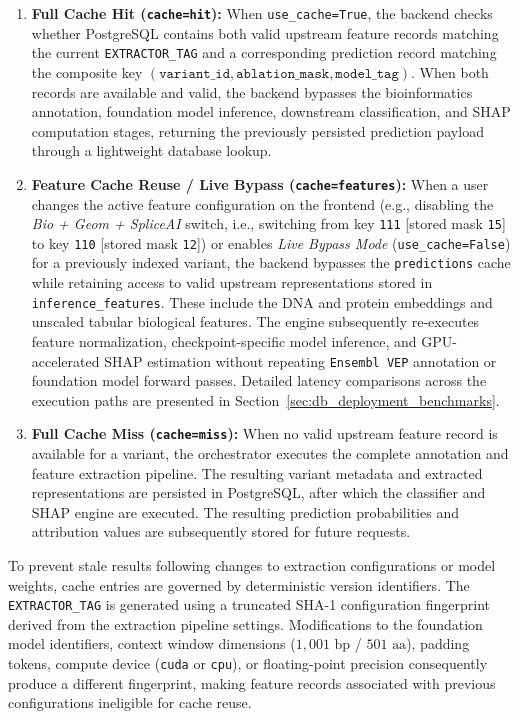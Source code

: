 \begin{enumerate}
    \item \textbf{Full Cache Hit (\texttt{cache=hit}):} When \texttt{use\_cache=True}, the backend checks whether PostgreSQL contains both valid upstream feature records matching the current \texttt{EXTRACTOR\_TAG} and a corresponding prediction record matching the composite key $(\texttt{variant\_id}, \texttt{ablation\_mask}, \texttt{model\_tag})$. When both records are available and valid, the backend bypasses the bioinformatics annotation, foundation model inference, downstream classification, and SHAP computation stages, returning the previously persisted prediction payload through a lightweight database lookup.

    \item \textbf{Feature Cache Reuse / Live Bypass (\texttt{cache=features}):} When a user changes the active feature configuration on the frontend (e.g., disabling the \textit{Bio + Geom + SpliceAI} switch, i.e., switching from key \texttt{111} [stored mask \texttt{15}] to key \texttt{110} [stored mask \texttt{12}]) or enables \textit{Live Bypass Mode} (\texttt{use\_cache=False}) for a previously indexed variant, the backend bypasses the \texttt{predictions} cache while retaining access to valid upstream representations stored in \texttt{inference\_features}. These include the DNA and protein embeddings and unscaled tabular biological features. The engine subsequently re-executes feature normalization, checkpoint-specific model inference, and GPU-accelerated SHAP estimation without repeating \texttt{Ensembl VEP} annotation or foundation model forward passes. Detailed latency comparisons across the execution paths are presented in Section~\ref{sec:db_deployment_benchmarks}.

    \item \textbf{Full Cache Miss (\texttt{cache=miss}):} When no valid upstream feature record is available for a variant, the orchestrator executes the complete annotation and feature extraction pipeline. The resulting variant metadata and extracted representations are persisted in PostgreSQL, after which the classifier and SHAP engine are executed. The resulting prediction probabilities and attribution values are subsequently stored for future requests.
\end{enumerate}

To prevent stale results following changes to extraction configurations or model weights, cache entries are governed by deterministic version identifiers. The \texttt{EXTRACTOR\_TAG} is generated using a truncated SHA-1 configuration fingerprint derived from the extraction pipeline settings. Modifications to the foundation model identifiers, context window dimensions ($1{,}001\text{ bp}$ / $501\text{ aa}$), padding tokens, compute device (\texttt{cuda} or \texttt{cpu}), or floating-point precision consequently produce a different fingerprint, making feature records associated with previous configurations ineligible for cache reuse.

